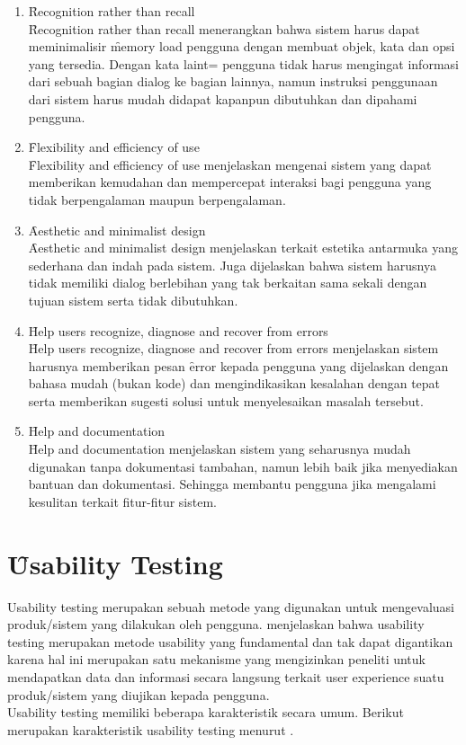 \begin{enumerate}
	\item \f{Recognition rather than recall}\\
	\f{Recognition rather than recall} menerangkan bahwa sistem harus dapat meminimalisir \f{memory load} pengguna dengan membuat objek, kata dan opsi yang tersedia. Dengan kata laint= pengguna tidak harus mengingat informasi dari sebuah bagian dialog ke bagian lainnya, namun instruksi penggunaan dari sistem harus mudah didapat kapanpun dibutuhkan dan dipahami pengguna.
	\item \f{Flexibility and efficiency of use}\\
	\f{Flexibility and efficiency of use} menjelaskan mengenai sistem yang dapat memberikan kemudahan dan mempercepat interaksi bagi pengguna yang tidak berpengalaman maupun berpengalaman.
	\item \f{Aesthetic and minimalist design}\\
	\f{Aesthetic and minimalist design} menjelaskan terkait estetika antarmuka yang sederhana dan indah pada sistem. Juga dijelaskan bahwa sistem harusnya tidak memiliki dialog berlebihan yang tak berkaitan sama sekali dengan tujuan sistem serta tidak dibutuhkan. 
	\item \f{Help users recognize, diagnose and recover from errors}\\
	\f{Help users recognize, diagnose and recover from errors} menjelaskan sistem harusnya memberikan pesan \f{error} kepada pengguna yang dijelaskan dengan bahasa mudah (bukan kode) dan mengindikasikan kesalahan dengan tepat serta memberikan sugesti solusi untuk menyelesaikan masalah tersebut.
	\item \f{Help and documentation}\\
	\f{Help and documentation} menjelaskan sistem yang seharusnya mudah digunakan tanpa dokumentasi tambahan, namun lebih baik jika menyediakan bantuan dan dokumentasi. Sehingga membantu pengguna jika mengalami kesulitan terkait fitur-fitur sistem.
\end{enumerate}
\section{\f{Usability Testing}}
Usability testing merupakan sebuah metode yang digunakan untuk mengevaluasi produk/sistem yang dilakukan oleh pengguna. \citet{} menjelaskan bahwa usability testing merupakan metode usability yang fundamental dan tak dapat digantikan karena hal ini merupakan satu mekanisme yang mengizinkan peneliti untuk mendapatkan data dan informasi secara langsung terkait user experience suatu produk/sistem yang diujikan kepada pengguna.
\newline\\
Usability testing memiliki beberapa karakteristik secara umum. Berikut merupakan karakteristik usability testing menurut \citet{}.

